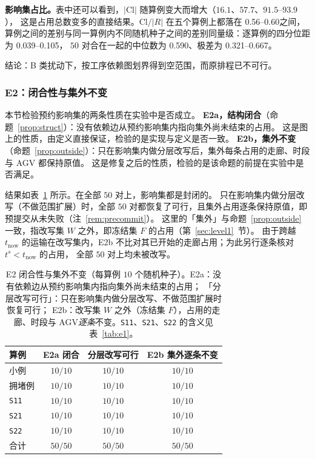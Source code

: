 \documentclass[manuscript,screen,review]{acmart}
\newcommand{\NSeeds}{10}
\newcommand{\NPairs}{50}
\newcommand{\FeasRtwo}{\NPairs/\NPairs}  %
\newcommand{\PassClosed}{\NPairs/\NPairs}    %
\newcommand{\PassInvar}{\NPairs/\NPairs}  %
\newcommand{\EoneCloLo}{0.56}
\newcommand{\EoneCloHi}{0.60}
\newcommand{\EoneFracIqrLo}{0.039}  %
\newcommand{\EoneFracIqrHi}{0.105}  %
\newcommand{\EoneFracMed}{0.590}    %
\newcommand{\EoneFracMin}{0.321}    %
\newcommand{\EoneFracMax}{0.667}    %
\begin{document}
\textbf{影响集占比。}表中还可以看到，\(|\mathrm{Cl}|\) 随算例变大而增大（\(16.1\)、\(57.7\)、\(91.5\)--\(93.9\)），
这是占用总数变多的直接结果。\(\mathrm{Cl}/|R|\) 在五个算例上都落在 \EoneCloLo--\EoneCloHi 之间，
算例之间的差别与同一算例内不同随机种子之间的差别同量级：逐算例的四分位距为 \EoneFracIqrLo--\EoneFracIqrHi，
\(\NPairs\) 对合在一起的中位数为 \EoneFracMed、极差为 \EoneFracMin--\EoneFracMax。

结论：B 类扰动下，按工序依赖图划界得到空范围，而原排程已不可行。

\subsubsection{E2：闭合性与集外不变}
\label{sec:e2}

本节检验预约影响集的两条性质在实验中是否成立。
\textbf{E2a，结构闭合}（命题~\ref{prop:struct}）：没有依赖边从预约影响集内指向集外尚未结束的占用。
这是图上的性质，由定义直接保证，检验的是实现与定义是否一致。
\textbf{E2b，集外不变}（命题~\ref{prop:outside}）：只在影响集内做分层改写后，集外每条占用的走廊、时段与 AGV 都保持原值。
这是修复之后的性质，检验的是该命题的前提在实验中是否满足。

结果如表~\ref{tab:e2} 所示。在全部 \(\NPairs\) 对上，影响集都是封闭的。
只在影响集内做分层改写（不做范围扩展）时，全部 \(\NPairs\) 对都恢复了可行，且集外占用逐条保持原值，即预提交从未失败（注~\ref{rem:precommit}）。
这里的「集外」与命题~\ref{prop:outside} 一致，指改写集 \(W\) 之外，即冻结集 \(F\) 的占用（第~\ref{sec:level1}~节）。
由于跨越 \(t_{\mathrm{now}}\) 的运输在改写集内，E2b 不比对其已开始的走廊占用；为此另行逐条核对 \(t^s<t_{\mathrm{now}}\) 的占用，
全部 \(\NPairs\) 对上均未被改写。

\begin{table}[t]
\centering
\caption{E2 闭合性与集外不变（每算例 \(\NSeeds\) 个随机种子）。E2a：没有依赖边从预约影响集内指向集外尚未结束的占用；
「分层改写可行」：只在影响集内做分层改写、不做范围扩展时恢复可行；
E2b：改写集 \(W\) 之外（冻结集 \(F\)），占用的走廊、时段与 AGV\emph{逐条}不变。\texttt{S11}、\texttt{S21}、\texttt{S22} 的含义见表~\ref{tab:e1}。}
\label{tab:e2}
\small
\begin{tabular}{@{}lccc@{}}
\toprule
算例 & E2a 闭合 & 分层改写可行 & E2b 集外逐条不变 \\
\midrule
小例   & \(10/10\) & \(10/10\) & \(10/10\) \\
拥堵例 & \(10/10\) & \(10/10\) & \(10/10\) \\
\texttt{S11}  & \(10/10\) & \(10/10\) & \(10/10\) \\
\texttt{S21}    & \(10/10\) & \(10/10\) & \(10/10\) \\
\texttt{S22}     & \(10/10\) & \(10/10\) & \(10/10\) \\
\midrule
合计 & \(\PassClosed\) & \(\FeasRtwo\) & \(\PassInvar\) \\
\bottomrule
\end{tabular}
\end{table}
\end{document}
